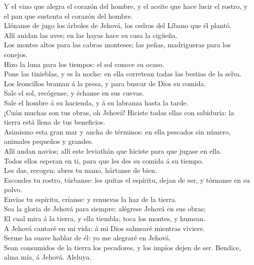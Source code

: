  Y el vino que alegra el corazón del hombre, y el aceite
que hace lucir el rostro, y el pan que sustenta el corazón del hombre.\\
 Llénanse de jugo los árboles de Jehová, los cedros del
Líbano que él plantó.\\
 Allí anidan las aves; en las hayas hace su casa la
cigüeña.\\
 Los montes altos para las cabras monteses; las peñas,
madrigueras para los conejos.\\
 Hizo la luna para los tiempos: el sol conoce su ocaso.\\
 Pone las tinieblas, y es la noche: en ella corretean
todas las bestias de la selva.\\
 Los leoncillos braman á la presa, y para buscar de Dios
su comida.\\
 Sale el sol, recógense, y échanse en sus cuevas.\\
 Sale el hombre á su hacienda, y á su labranza hasta la
tarde.\\
 ¡Cuán muchas son tus obras, oh Jehová! Hiciste todas
ellas con sabiduría: la tierra está llena de tus beneficios.\\
 Asimismo esta gran mar y ancha de términos: en ella
pescados sin número, animales pequeños y grandes.\\
 Allí andan navíos; allí este leviathán que hiciste para
que jugase en ella.\\
 Todos ellos esperan en ti, para que les des su comida á
su tiempo.\\
 Les das, recogen; abres tu mano, hártanse de bien.\\
 Escondes tu rostro, túrbanse: les quitas el espíritu,
dejan de ser, y tórnanse en su polvo.\\
 Envías tu espíritu, críanse: y renuevas la haz de la
tierra.\\
 Sea la gloria de Jehová para siempre; alégrese Jehová en
sus obras;\\
 El cual mira á la tierra, y ella tiembla; toca los
montes, y humean.\\
 A Jehová cantaré en mi vida: á mi Dios salmearé mientras
viviere.\\
 Serme ha suave hablar de él: yo me alegraré en Jehová.\\
 Sean consumidos de la tierra los pecadores, y los impíos
dejen de ser. Bendice, alma mía, á Jehová. Aleluya.

